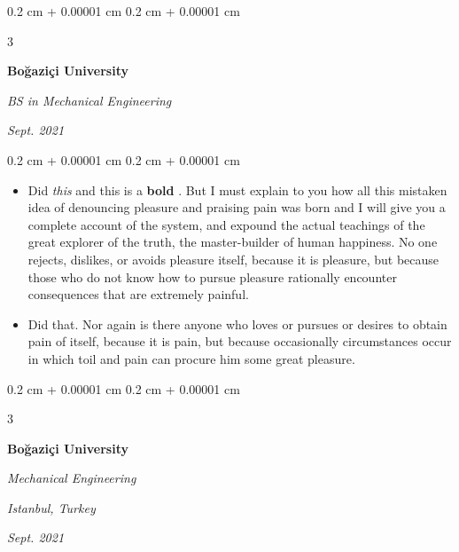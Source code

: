 \documentclass[10pt, letterpaper]{article}
\newenvironment{highlights}{
    \begin{itemize}[
        topsep=0.10 cm,
        parsep=0.10 cm,
        partopsep=0pt,
        itemsep=0pt,
        leftmargin=0.4 cm + 10pt + 0.6 cm
    ]
}{
    \end{itemize}
} %
\newenvironment{onecolentry}{
    \begin{adjustwidth}{
        0.2 cm + 0.00001 cm
    }{
        0.2 cm + 0.00001 cm
    }
}{
    \end{adjustwidth}
} %
\newenvironment{threecolentry}[3][]{
    \onecolentry
    \def\thirdColumn{#3}
    \setcolumnwidth{0.6 cm, \fill, 4.5 cm}
    \begin{paracol}{3}
    #2 \switchcolumn
}{
    \switchcolumn \raggedleft \thirdColumn
    \end{paracol}
    \endonecolentry
} %
\let\hrefWithoutArrow\href
\renewcommand{\href}[2]{\hrefWithoutArrow{#1}{\mbox{\ifthenelse{\equal{#2}{}}{ }{#2 }\raisebox{.15ex}{\footnotesize \faExternalLink*}}}}
\begin{document}
        \vspace{0.2 cm-3px}

        \begin{threecolentry}{
            \vspace*{\fill}
            \textbullet
            \vspace*{3px}
            \vspace*{\fill}
        }{
            
            
        \textit{Sept. 2021}}
            \textbf{Boğaziçi University}

            \textit{BS in Mechanical Engineering}
        \end{threecolentry}

        \vspace{0.10 cm-3px}
        \begin{onecolentry}
            \begin{highlights}
                \item Did \textit{this} and this is a \textbf{bold} \href{https://example.com}{link}. But I must explain to you how all this mistaken idea of denouncing pleasure and praising pain was born and I will give you a complete account of the system, and expound the actual teachings of the great explorer of the truth, the master-builder of human happiness. No one rejects, dislikes, or avoids pleasure itself, because it is pleasure, but because those who do not know how to pursue pleasure rationally encounter consequences that are extremely painful.
                \item Did that. Nor again is there anyone who loves or pursues or desires to obtain pain of itself, because it is pain, but because occasionally circumstances occur in which toil and pain can procure him some great pleasure.
            \end{highlights}
        \end{onecolentry}


        \vspace{0.2 cm-3px}

        \begin{threecolentry}{
            \vspace*{\fill}
            \textbullet
            \vspace*{3px}
            \vspace*{\fill}
        }{
        \textit{Istanbul, Turkey}    
            
        \textit{Sept. 2021}}
            \textbf{Boğaziçi University}

            \textit{Mechanical Engineering}
        \end{threecolentry}
\end{document}
